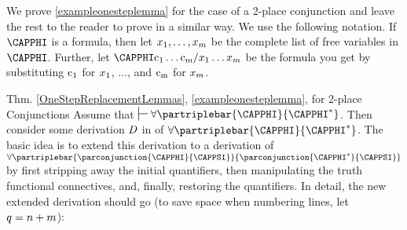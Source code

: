 \noindent{}We prove \ref{exampleonesteplemma} for the case of a 2-place conjunction and leave the rest to the reader to prove in a similar way.
We use the following notation. 
If $\CAPPHI$ is a \GQL{} formula, then let $x_1,\ldots,x_{m}$ be the complete list of free variables in $\CAPPHI$. 
Further, let $\CAPPHI\constant{c_{\integer{1}}}\ldots\constant{c_{\integer{\integer{m}}}}/\variable{x}_1\ldots\variable{x}_{\integer{m}}$ be the formula you get by substituting $\mathrm{c_1}$ for $x_1$, $\ldots$, and $\mathrm{c_{m}}$ for $x_{m}$.
\begin{PROOFOF}{Thm. \ref{OneStepReplacementLemmas}, \ref{exampleonesteplemma}, for 2-place Conjunctions}
Assume that $\sststile{}{}\forall\partriplebar{\CAPPHI}{\CAPPHI^*}$. 
Then consider some derivation $\mathit{D}$ in \GQD{} of $\forall\partriplebar{\CAPPHI}{\CAPPHI^*}$.
The basic idea is to extend this derivation to a derivation of $\forall\partriplebar{\parconjunction{\CAPPHI}{\CAPPSI}}{\parconjunction{\CAPPHI^*}{\CAPPSI}}$ by first stripping away the initial quantifiers, then manipulating the truth functional connectives, and, finally, restoring the quantifiers. In detail, the new extended derivation should go (to save space when numbering lines, let $q=n+m$):
\begin{gproofnn}
\glinend{ }{$\qquad\vdots$}{ }
\glinend{ }{$\qquad\vdots$}{ }
\end{gproofnn}
\end{PROOFOF}
